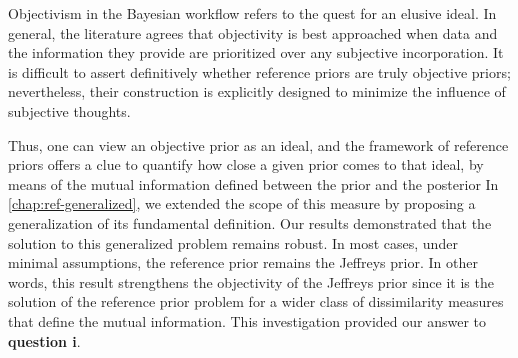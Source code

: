 










Objectivism in the Bayesian workflow refers to the quest for an elusive ideal. %
In general, the literature agrees that objectivity is best approached when data and the information they provide are prioritized over any subjective incorporation. It is difficult to assert definitively whether reference priors are truly objective priors; nevertheless, their construction is explicitly designed to minimize the influence of subjective thoughts.

Thus, one can view an objective prior as an ideal, and the framework of reference priors offers
a clue to quantify how close a given prior comes to that ideal, by means of the mutual information defined between the prior and the posterior
In \cref{chap:ref-generalized}, we extended the scope of this measure by proposing a generalization of its fundamental definition. %
Our results demonstrated that the solution to this generalized problem remains robust. In most cases, under minimal assumptions, the reference prior remains the Jeffreys prior. 
In other words, this result strengthens the objectivity of  the Jeffreys prior since it is the solution of the reference prior problem for a wider class of dissimilarity measures that define the mutual information. %
This investigation provided our answer to \textbf{question i}.

